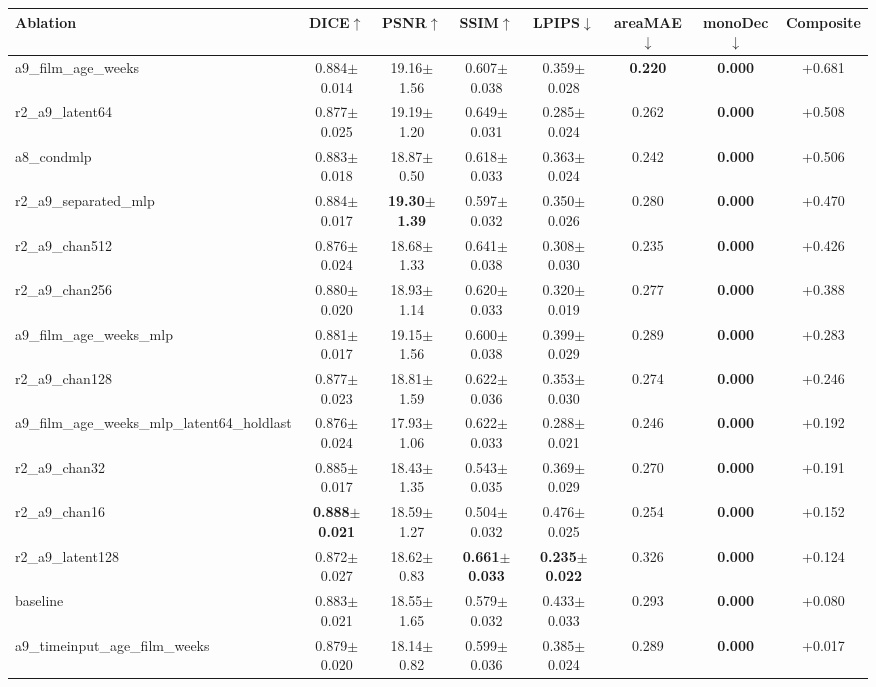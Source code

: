 \begin{tabular}{lccccccc}
\toprule
Ablation & DICE$\uparrow$ & PSNR$\uparrow$ & SSIM$\uparrow$ & LPIPS$\downarrow$ & areaMAE$\downarrow$ & monoDec$\downarrow$ & Composite \\
\midrule
a9\_film\_age\_weeks & 0.884$\pm$0.014 & 19.16$\pm$1.56 & 0.607$\pm$0.038 & 0.359$\pm$0.028 & \textbf{0.220} & \textbf{0.000} & +0.681 \\
r2\_a9\_latent64 & 0.877$\pm$0.025 & 19.19$\pm$1.20 & 0.649$\pm$0.031 & 0.285$\pm$0.024 & 0.262 & \textbf{0.000} & +0.508 \\
a8\_condmlp & 0.883$\pm$0.018 & 18.87$\pm$0.50 & 0.618$\pm$0.033 & 0.363$\pm$0.024 & 0.242 & \textbf{0.000} & +0.506 \\
r2\_a9\_separated\_mlp & 0.884$\pm$0.017 & \textbf{19.30$\pm$1.39} & 0.597$\pm$0.032 & 0.350$\pm$0.026 & 0.280 & \textbf{0.000} & +0.470 \\
r2\_a9\_chan512 & 0.876$\pm$0.024 & 18.68$\pm$1.33 & 0.641$\pm$0.038 & 0.308$\pm$0.030 & 0.235 & \textbf{0.000} & +0.426 \\
r2\_a9\_chan256 & 0.880$\pm$0.020 & 18.93$\pm$1.14 & 0.620$\pm$0.033 & 0.320$\pm$0.019 & 0.277 & \textbf{0.000} & +0.388 \\
a9\_film\_age\_weeks\_mlp & 0.881$\pm$0.017 & 19.15$\pm$1.56 & 0.600$\pm$0.038 & 0.399$\pm$0.029 & 0.289 & \textbf{0.000} & +0.283 \\
r2\_a9\_chan128 & 0.877$\pm$0.023 & 18.81$\pm$1.59 & 0.622$\pm$0.036 & 0.353$\pm$0.030 & 0.274 & \textbf{0.000} & +0.246 \\
a9\_film\_age\_weeks\_mlp\_latent64\_holdlast & 0.876$\pm$0.024 & 17.93$\pm$1.06 & 0.622$\pm$0.033 & 0.288$\pm$0.021 & 0.246 & \textbf{0.000} & +0.192 \\
r2\_a9\_chan32 & 0.885$\pm$0.017 & 18.43$\pm$1.35 & 0.543$\pm$0.035 & 0.369$\pm$0.029 & 0.270 & \textbf{0.000} & +0.191 \\
r2\_a9\_chan16 & \textbf{0.888$\pm$0.021} & 18.59$\pm$1.27 & 0.504$\pm$0.032 & 0.476$\pm$0.025 & 0.254 & \textbf{0.000} & +0.152 \\
r2\_a9\_latent128 & 0.872$\pm$0.027 & 18.62$\pm$0.83 & \textbf{0.661$\pm$0.033} & \textbf{0.235$\pm$0.022} & 0.326 & \textbf{0.000} & +0.124 \\
baseline & 0.883$\pm$0.021 & 18.55$\pm$1.65 & 0.579$\pm$0.032 & 0.433$\pm$0.033 & 0.293 & \textbf{0.000} & +0.080 \\
a9\_timeinput\_age\_film\_weeks & 0.879$\pm$0.020 & 18.14$\pm$0.82 & 0.599$\pm$0.036 & 0.385$\pm$0.024 & 0.289 & \textbf{0.000} & +0.017 \\

\end{tabular}
